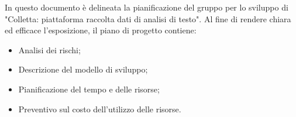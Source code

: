 In questo documento è delineata la pianificazione del gruppo \gruppo \space per lo sviluppo
di "Colletta: piattaforma raccolta dati di analisi di testo". \newline
Al fine di rendere chiara ed efficace l'esposizione, il piano di progetto contiene:
\begin{itemize}
    \item Analisi dei rischi;
    \item Descrizione del modello di sviluppo;
    \item Pianificazione del tempo e delle risorse;
    \item Preventivo sul costo dell'utilizzo delle risorse.
\end{itemize}
